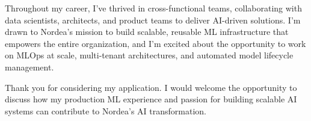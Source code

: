 \documentclass[11pt, a4paper]{awesome-cv}
\begin{document}
\begin{cvletter}
Throughout my career, I've thrived in cross-functional teams, collaborating with data scientists, architects, and product teams to deliver AI-driven solutions. I'm drawn to Nordea's mission to build scalable, reusable ML infrastructure that empowers the entire organization, and I'm excited about the opportunity to work on MLOps at scale, multi-tenant architectures, and automated model lifecycle management.

Thank you for considering my application. I would welcome the opportunity to discuss how my production ML experience and passion for building scalable AI systems can contribute to Nordea's AI transformation.

\end{cvletter}


\makeletterclosing
\end{document}
